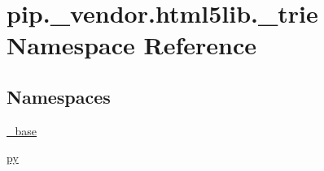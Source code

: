 \hypertarget{namespacepip_1_1__vendor_1_1html5lib_1_1__trie}{}\section{pip.\+\_\+vendor.\+html5lib.\+\_\+trie Namespace Reference}
\label{namespacepip_1_1__vendor_1_1html5lib_1_1__trie}
\subsection*{Namespaces}
\begin{DoxyCompactItemize}
\item 
 \hyperlink{namespacepip_1_1__vendor_1_1html5lib_1_1__trie_1_1__base}{\+\_\+base}
\item 
 \hyperlink{namespacepip_1_1__vendor_1_1html5lib_1_1__trie_1_1py}{py}
\end{DoxyCompactItemize}
